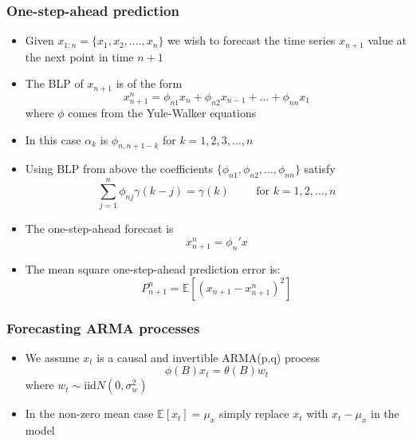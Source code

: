\documentclass{article}
\begin{document}
\subsubsection{One-step-ahead prediction}
\begin{itemize}
    \item Given $x_{1:n} = \{x_1,x_2,....,x_n\}$ we wish to forecast the time series $x_{n+1}$ value at the next point in time $n+1$
    \item The BLP of $x_{n+1}$ is of the form
    \begin{equation*}
        x_{n+1}^n = \phi_{n1} x_n + \phi_{n2}x_{n-1} + ... + \phi_{nn} x_1
    \end{equation*}
    where $\phi$ comes from the Yule-Walker equations
    \item In this case $\alpha_k$ is $\phi_{n,n+1-k}$ for $k = 1,2,3,...,n$
    \item Using BLP from above the coefficients $\{\phi_{n1}, \phi_{n2} , ..., \phi_{nn}\}$ satisfy
    \begin{equation*}
        \sum_{j=1}^n \phi_{nj} \gamma(k-j) = \gamma(k) \hspace{1cm} \text{for } k = 1,2,...,n
    \end{equation*}
    \item The one-step-ahead forecast is
    \begin{equation*}
        x_{n+1}^n = \phi_n ' x
    \end{equation*}
    \item The mean square one-step-ahead prediction error is:
    \begin{equation*}
        P_{n+1}^n = \mathbb{E}[(x_{n+1} - x_{n+1}^n)^2]
    \end{equation*}
\end{itemize}




\subsubsection{Forecasting ARMA processes}
\begin{itemize}
    \item We assume $x_t$ is a causal and invertible ARMA(p,q) process
    \begin{equation*}
        \phi(B) x_t = \theta(B) w_t
    \end{equation*}
    where $w_t \sim \mathrm{iid}N(0,\sigma^2_w)$
    \item In the non-zero mean case $\mathbb{E}[x_t] = \mu_x$ simply replace $x_t $ with $x_t - \mu_x$ in the model
\end{itemize}
\end{document}
